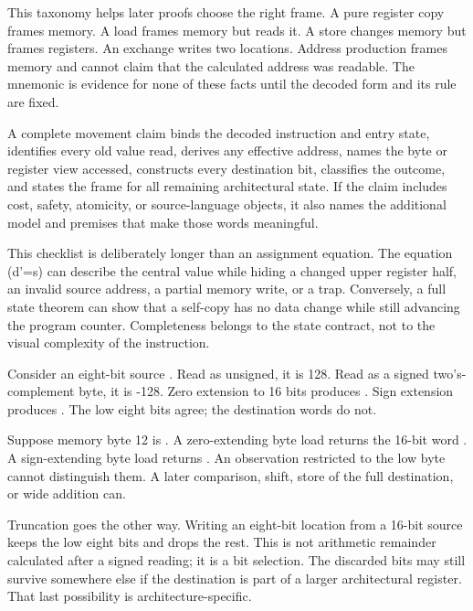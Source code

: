 This taxonomy helps later proofs choose the right frame. A pure register copy
frames memory. A load frames memory but reads it. A store changes memory but
frames registers. An exchange writes two locations. Address production frames
memory and cannot claim that the calculated address was readable. The mnemonic
is evidence for none of these facts until the decoded form and its rule are
fixed.

\begin{definition}[title={A complete movement claim}]
A complete movement claim binds the decoded instruction and entry state,
identifies every old value read, derives any effective address, names the byte
or register view accessed, constructs every destination bit, classifies the
outcome, and states the frame for all remaining architectural state. If the
claim includes cost, safety, atomicity, or source-language objects, it also
names the additional model and premises that make those words meaningful.
\end{definition}

This checklist is deliberately longer than an assignment equation. The
equation (d'=s) can describe the central value while hiding a changed upper
register half, an invalid source address, a partial memory write, or a trap.
Conversely, a full state theorem can show that a self-copy has no data change
while still advancing the program counter. Completeness belongs to the state
contract, not to the visual complexity of the instruction.

Consider an eight-bit source . Read as unsigned, it is 128. Read as a
signed two's-complement byte, it is -128. Zero extension to 16 bits produces
. Sign extension produces . The low eight bits agree;
the destination words do not.

\begin{example}[title={One byte, two full-width results}]
Suppose memory byte 12 is . A zero-extending byte load returns the
16-bit word . A sign-extending byte load returns .
An observation restricted to the low byte cannot distinguish them. A later
comparison, shift, store of the full destination, or wide addition can.
\end{example}

Truncation goes the other way. Writing an eight-bit location from a 16-bit
source keeps the low eight bits and drops the rest. This is not arithmetic
remainder calculated after a signed reading; it is a bit selection. The discarded
bits may still survive somewhere else if the destination is part of a larger
architectural register. That last possibility is architecture-specific.

